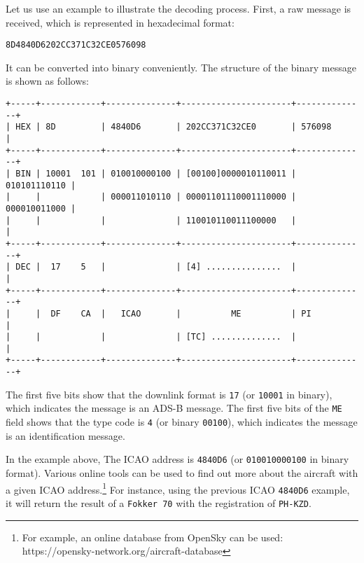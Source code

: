 Let us use an example to illustrate the decoding process. First, a raw message is received, which is represented in hexadecimal format:

\begin{verbatim}
8D4840D6202CC371C32CE0576098
\end{verbatim}

It can be converted into binary conveniently. The structure of the binary message is shown as follows:

\begin{verbatim}
+-----+------------+--------------+----------------------+--------------+
| HEX | 8D         | 4840D6       | 202CC371C32CE0       | 576098       |
+-----+------------+--------------+----------------------+--------------+
| BIN | 10001  101 | 010010000100 | [00100]0000010110011 | 010101110110 |
|     |            | 000011010110 | 00001101110001110000 | 000010011000 |
|     |            |              | 110010110011100000   |              |
+-----+------------+--------------+----------------------+--------------+
| DEC |  17    5   |              | [4] ...............  |              |
+-----+------------+--------------+----------------------+--------------+
|     |  DF    CA  |   ICAO       |          ME          | PI           |
|     |            |              | [TC] ..............  |              |
+-----+------------+--------------+----------------------+--------------+
\end{verbatim}

The first five bits show that the downlink format is \texttt{17} (or \texttt{10001} in binary), which indicates the message is an ADS-B message. The first five bits of the \texttt{ME} field shows that the type code is \texttt{4} (or binary \texttt{00100}), which indicates the message is an identification message.

In the example above, The ICAO address is \texttt{4840D6} (or \texttt{010010000100} in binary format). Various online tools can be used to find out more about the aircraft with a given ICAO address.\footnote{For example, an online database from OpenSky can be used:\\ https://opensky-network.org/aircraft-database} For instance, using the previous ICAO \texttt{4840D6} example, it will return the result of a \texttt{Fokker\ 70} with the registration of \texttt{PH-KZD}.


